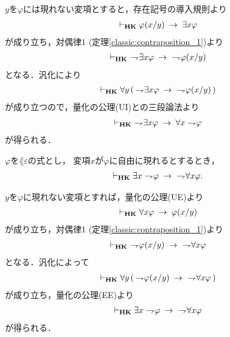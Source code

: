 	\begin{sketch}
		$y$を$\varphi$には現れない変項とすると，存在記号の導入規則より
		\begin{align}
			\vdash_{{\scriptsize \mbox{{\bf HK}}}} \varphi(x/y) \hspace{0.25em}\rightarrow\hspace{0.25em} \exists x \varphi
		\end{align}
		が成り立ち，対偶律$1$ (定理\ref{classic:contraposition_1})より
		\begin{align}
			\provable{\mbox{{\bf HK}}}\ 
			\negation \exists x \varphi \rarrow\ \negation \varphi(x/y) 
		\end{align}
		となる．汎化により
		\begin{align}
			\vdash_{{\scriptsize \mbox{{\bf HK}}}} \forall y\, (\, \rightharpoondown\hspace{-0.25em} \exists x \varphi \hspace{0.25em}\rightarrow\hspace{0.25em}\ \rightharpoondown\hspace{-0.25em} \varphi(x/y) \, ) 
		\end{align}
		が成り立つので，量化の公理(UI)との三段論法より
		\begin{align}
			\provable{\mbox{{\bf HK}}}\ 
			\negation \exists x \varphi \rarrow \forall x \negation \varphi 
		\end{align}
		が得られる．
		\QED
	\end{sketch}
	
	\begin{screen}
		\begin{thm}
		\label{classic:strong_De_Morgan_law_for_quantifier_1}
			$\varphi$を$\lang{\varepsilon}$の式とし，
			変項$x$が$\varphi$に自由に現れるとするとき，
			\begin{align}
				\vdash_{{\scriptsize \mbox{{\bf HK}}}}
				\exists x \rightharpoondown\hspace{-0.25em} \varphi \hspace{0.25em}\rightarrow\hspace{0.25em}\ \rightharpoondown\hspace{-0.25em} \forall x \varphi.
			\end{align}
		\end{thm}
	\end{screen}
	
	\begin{sketch}
		$y$を$\varphi$に現れない変項とすれば，量化の公理(UE)より
		\begin{align}
			\vdash_{{\scriptsize \mbox{{\bf HK}}}} \forall x \varphi \hspace{0.25em}\rightarrow\hspace{0.25em} \varphi(x/y)
		\end{align}
		が成り立ち，対偶律1 (定理\ref{classic:contraposition_1})より
		\begin{align}
			\provable{\mbox{{\bf HK}}}\ \negation \varphi(x/y) \rarrow\ \negation \forall x \varphi
		\end{align}
		となる．汎化によって
		\begin{align}
			\vdash_{{\scriptsize \mbox{{\bf HK}}}} \forall y\, (\, \rightharpoondown\hspace{-0.25em} \varphi(x/y) \hspace{0.25em}\rightarrow\hspace{0.25em}\ \rightharpoondown\hspace{-0.25em} \forall x \varphi\, )
		\end{align}
		が成り立ち，量化の公理(EE)より
		\begin{align}
			\vdash_{{\scriptsize \mbox{{\bf HK}}}} \exists x \rightharpoondown\hspace{-0.25em} \varphi \hspace{0.25em}\rightarrow\hspace{0.25em}\ \rightharpoondown\hspace{-0.25em} \forall x \varphi
		\end{align}
		が得られる．
		\QED
	\end{sketch}
	
